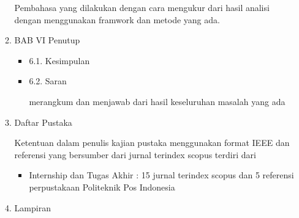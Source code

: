 \begin{enumerate}
\begin{enumerate}
Pembahasa yang dilakukan dengan cara mengukur dari hasil analisi dengan menggunakan framwork dan metode yang ada.
\item BAB VI Penutup
\begin{itemize}
\item 6.1.	Kesimpulan
\item 6.2.  Saran

merangkum dan menjawab dari hasil keseluruhan masalah yang ada
 
\end{itemize}
\item Daftar Pustaka

Ketentuan dalam penulis kajian pustaka menggunakan format IEEE dan referensi yang bersumber dari jurnal terindex scopus terdiri dari
\begin{itemize}
\item
Internship dan Tugas Akhir : 15 jurnal terindex scopus dan 5 referensi perpustakaan Politeknik Pos Indonesia
\end{itemize}
\item Lampiran
\end{enumerate}
\end{enumerate}

